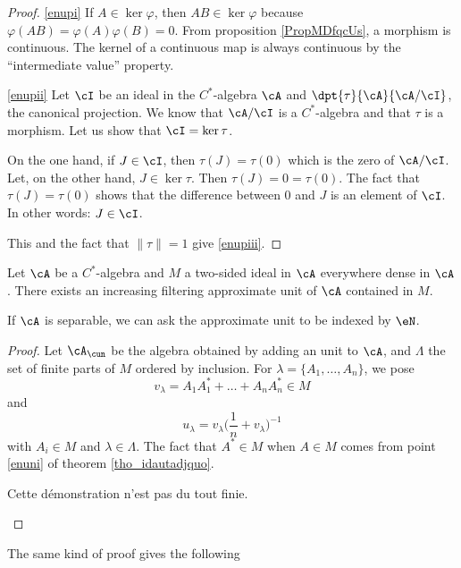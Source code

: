 \begin{proof}
    \ref{enupi} If $A\in\ker\varphi$, then $AB\in\ker\varphi$ because $\varphi(AB)=\varphi(A)\varphi(B)=0$. From proposition \ref{PropMDfqcUs}, a morphism is continuous. The kernel of a continuous map is always continuous by the ``intermediate value'' property.

    \ref{enupii} Let $\cI$ be an ideal in the $C^*$-algebra $\cA$ and $\dpt{\tau}{\cA}{\cA/\cI}$, the canonical projection. We know that $\cA/\cI$ is a $C^*$-algebra and that $\tau$ is a morphism. Let us show that $\cI=\ker\tau$.

    On the one hand, if $J\in\cI$, then $\tau(J)=\tau(0)$ which is the zero of $\cA/\cI$. Let, on the other hand, $J\in\ker\tau$. Then $\tau(J)=0=\tau(0)$. The fact that $\tau(J)=\tau(0)$ shows that the difference between $0$ and $J$ is an element of $\cI$. In other words: $J\in\cI$.

    This and the fact that $\| \tau \|=1$ give \ref{enupiii}.
\end{proof}


\begin{proposition} 
Let $\cA$ be a $C^*$-algebra  and $M$ a two-sided ideal in $\cA$ everywhere dense in $\cA$. There exists an increasing filtering approximate unit of $\cA$ contained in $M$.

If $\cA$ is separable, we can ask the approximate unit to be indexed by $\eN$.

\end{proposition}
\begin{proof}
Let $\cA_{\cun}$ be the algebra obtained by adding an unit to $\cA$, and $\Lambda$ the set of finite parts of $M$ ordered by inclusion. For $\lambda=\{ A_1,\ldots, A_n \}$, we pose
\[ 
  v_{\lambda}=A_1A_1^*+\ldots+A_nA_n^*\in M
\]
 and 
\[ 
  u_{\lambda}=v_{\lambda}\big( \frac{1}{ n }+v_{\lambda} \big)^{-1}
\]
with $A_i\in M$ and $\lambda\in\Lambda$. The fact that $A^*\in M$ when $A\in M$ comes from point \ref{enuni} of theorem \ref{tho_idautadjquo}.

\begin{probleme}
Cette démonstration n'est pas du tout finie.
\end{probleme}

\end{proof}

The same kind of proof gives the following


